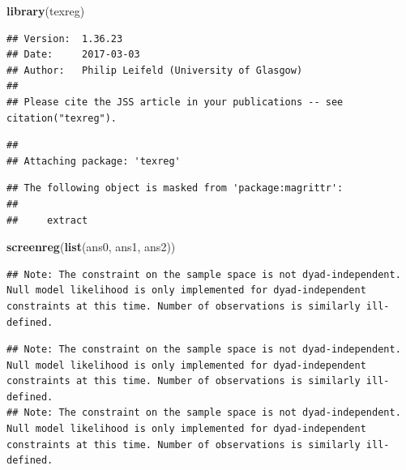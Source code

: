 \documentclass[]{book}
\newenvironment{Shaded}{\begin{snugshade}}{\end{snugshade}}
\newcommand{\KeywordTok}[1]{\textcolor[rgb]{0.13,0.29,0.53}{\textbf{#1}}}
\newcommand{\NormalTok}[1]{#1}
\theoremstyle{definition}
\theoremstyle{definition}
\theoremstyle{definition}
\theoremstyle{remark}
\begin{document}
\begin{Shaded}
\begin{Highlighting}[]
\KeywordTok{library}\NormalTok{(texreg)}
\end{Highlighting}
\end{Shaded}

\begin{verbatim}
## Version:  1.36.23
## Date:     2017-03-03
## Author:   Philip Leifeld (University of Glasgow)
## 
## Please cite the JSS article in your publications -- see citation("texreg").
\end{verbatim}

\begin{verbatim}
## 
## Attaching package: 'texreg'
\end{verbatim}

\begin{verbatim}
## The following object is masked from 'package:magrittr':
## 
##     extract
\end{verbatim}

\begin{Shaded}
\begin{Highlighting}[]
\KeywordTok{screenreg}\NormalTok{(}\KeywordTok{list}\NormalTok{(ans0, ans1, ans2))}
\end{Highlighting}
\end{Shaded}

\begin{verbatim}
## Note: The constraint on the sample space is not dyad-independent. Null model likelihood is only implemented for dyad-independent constraints at this time. Number of observations is similarly ill-defined.
\end{verbatim}

\begin{verbatim}
## Note: The constraint on the sample space is not dyad-independent. Null model likelihood is only implemented for dyad-independent constraints at this time. Number of observations is similarly ill-defined.
## Note: The constraint on the sample space is not dyad-independent. Null model likelihood is only implemented for dyad-independent constraints at this time. Number of observations is similarly ill-defined.
\end{verbatim}
\end{document}

